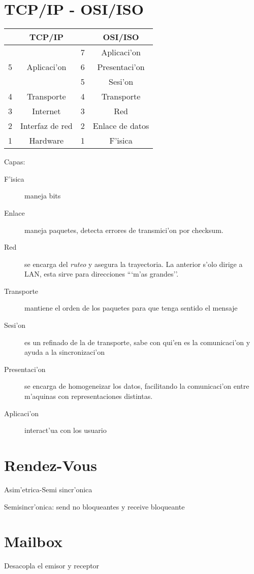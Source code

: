 \documentclass[a4paper,spanish]{article}
\begin{document}
\section{TCP/IP - OSI/ISO}
\begin{tabular}{|c|c|c|c|}
\hline
&TCP/IP & & OSI/ISO\\ \hline
 & 		& 7 & Aplicaci'on\\
5& Aplicaci'on 	& 6 & Presentaci'on\\
 & 	 	& 5 & Sesi'on\\
4& Transporte 	& 4 & Transporte\\
3& Internet	& 3 & Red\\
2& Interfaz de red &2& Enlace de datos\\
1& Hardware	& 1 & F'isica\\ \hline
\end{tabular}

Capas:
\begin{description}
	\item[F'isica] maneja bits
	\item[Enlace] maneja paquetes, detecta errores de transmici'on por checksum.
	\item[Red] se encarga del \emph{ruteo}  y asegura la trayectoria. La anterior s'olo dirige a LAN, esta sirve para direcciones ```m'as grandes''.
	\item[Transporte] mantiene el orden de los paquetes para que tenga sentido el mensaje
	\item[Sesi'on] es un refinado de la de transporte, sabe con qui'en es la comunicaci'on y ayuda a la sincronizaci'on
	\item[Presentaci'on] se encarga de homogeneizar los datos, facilitando la comunicaci'on entre m'aquinas con representaciones distintas.
	\item[Aplicaci'on] interact'ua con los usuario
\end{description}

\section{Rendez-Vous}
Asim'etrica-Semi sincr'onica

Semisincr'onica: send no bloqueantes y receive bloqueante

\section{Mailbox}
Desacopla el emisor y receptor
\end{document}
